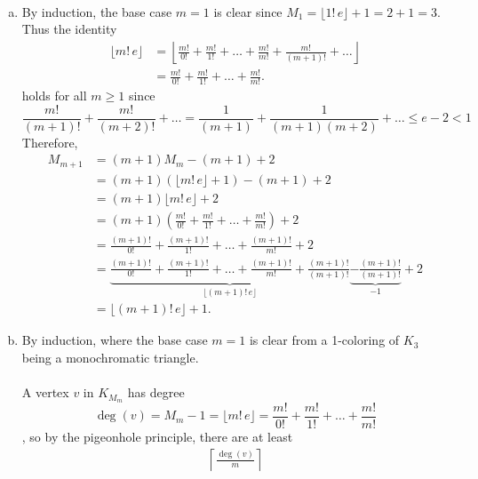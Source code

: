 \documentclass{article}
\newenvironment{solution}[1][Solution.]{\begin{trivlist}
\item[\hskip \labelsep {\bfseries #1}]}{\end{trivlist}}
\begin{document}
\begin{solution} ~
  \begin{enumerate}[(a)]
    \item By induction, the base case $m=1$ is clear since
    $M_1 = \lfloor 1!\,e\rfloor + 1 = 2 + 1 = 3$.
    Thus the identity \begin{align*}
      \lfloor m!\,e \rfloor
      &= \left\lfloor \frac{m!}{0!} + \frac{m!}{1!} + \hdots + \frac{m!}{m!}
        + \frac{m!}{(m+1)!} + \hdots \right\rfloor \\
      &= \frac{m!}{0!} + \frac{m!}{1!} + \hdots + \frac{m!}{m!}.
    \end{align*} holds for all $m \geq 1$ since \[
      \frac{m!}{(m+1)!} + \frac{m!}{(m+2)!} + \hdots
      = \frac{1}{(m+1)} + \frac{1}{(m+1)(m+2)} + \hdots
      \leq e - 2
      < 1
    \]
    Therefore,
    \begin{align*}
      M_{m+1} &= (m+1)M_m - (m+1) + 2 \\
              &= (m+1)(\lfloor m!\,e \rfloor + 1) - (m+1) + 2 \\
              &= (m+1)\lfloor m!\,e \rfloor + 2 \\
              &= (m+1)\left( \frac{m!}{0!} + \frac{m!}{1!} + \hdots + \frac{m!}{m!} \right) + 2 \\
              &= \frac{(m+1)!}{0!} + \frac{(m+1)!}{1!} + \hdots + \frac{(m+1)!}{m!} + 2 \\
              &= \underbrace{
                \frac{(m+1)!}{0!}
                + \frac{(m+1)!}{1!} + \hdots
                + \frac{(m+1)!}{m!}
                + \frac{(m+1)!}{(m+1)!}
              }_{\lfloor (m+1)!\, e \rfloor}
              \underbrace{- \frac{(m+1)!}{(m+1)!}}_{-1} + 2 \\
              &= \lfloor (m+1)!\, e \rfloor + 1.
    \end{align*}
    \item By induction, where the base case $m=1$ is clear from a 1-coloring of
    $K_3$ being a monochromatic triangle.
    \\~\\
    A vertex $v$ in $K_{M_m}$ has degree \[
      \deg(v) = M_m - 1 = \lfloor m!\,e\rfloor = \frac{m!}{0!} + \frac{m!}{1!} + \hdots + \frac{m!}{m!}
    \], so by
    the pigeonhole principle, there are at least \begin{align*}
      \left\lceil \frac{\deg(v)}{m} \right\rceil

\end{align*}
\end{enumerate}
\end{solution}
\end{document}
